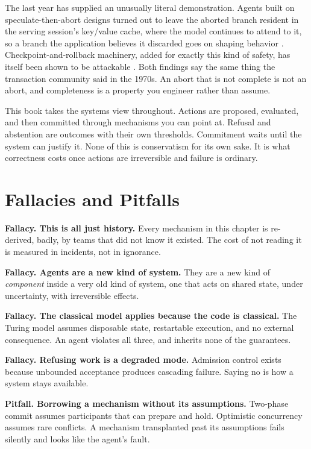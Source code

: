 The last year has supplied an unusually literal demonstration. Agents built on
speculate-then-abort designs turned out to leave the aborted branch resident in the
serving session's key/value cache, where the model continues to attend to it, so a
branch the application believes it discarded goes on shaping behavior
\cite{abortedkv2026}. Checkpoint-and-rollback machinery, added for exactly this
kind of safety, has itself been shown to be attackable \cite{saferesume2026}. Both
findings say the same thing the transaction community said in the 1970s. An abort
that is not complete is not an abort, and completeness is a property you engineer
rather than assume.

This book takes the systems view throughout. Actions are proposed, evaluated, and
then committed through mechanisms you can point at. Refusal and abstention are
outcomes with their own thresholds. Commitment waits until the system can justify
it. None of this is conservatism for its own sake. It is what correctness costs
once actions are irreversible and failure is ordinary.

\section{Fallacies and Pitfalls}

\textbf{Fallacy. This is all just history.} Every mechanism in this chapter is
re-derived, badly, by teams that did not know it existed. The cost of not reading
it is measured in incidents, not in ignorance.

\textbf{Fallacy. Agents are a new kind of system.} They are a new kind of
\emph{component} inside a very old kind of system, one that acts on shared
state, under uncertainty, with irreversible effects.

\textbf{Fallacy. The classical model applies because the code is classical.} The
Turing model assumes disposable state, restartable execution, and no external
consequence. An agent violates all three, and inherits none of the guarantees.

\textbf{Fallacy. Refusing work is a degraded mode.} Admission control exists
because unbounded acceptance produces cascading failure. Saying no is how a
system stays available.

\textbf{Pitfall. Borrowing a mechanism without its assumptions.} Two-phase commit
assumes participants that can prepare and hold. Optimistic concurrency assumes
rare conflicts. A mechanism transplanted past its assumptions fails silently and
looks like the agent's fault.

